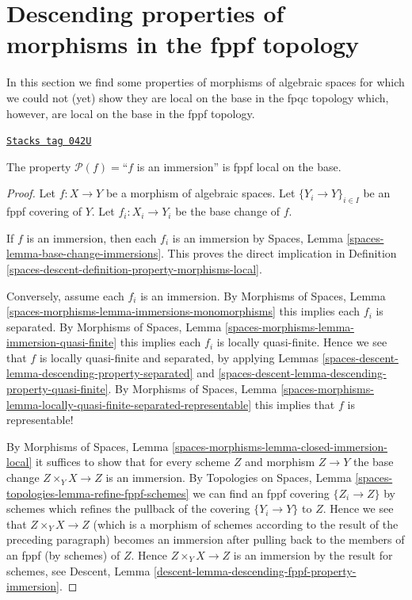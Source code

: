 \section{Descending properties of morphisms in the fppf topology}
\label{spaces-descent-section-descending-properties-morphisms-fppf}
In this section we find some properties of morphisms of algebraic spaces
for which we could not (yet) show they are local on the base in
the fpqc topology which, however, are local on the base
in the fppf topology.

\begin{lemma}
\label{spaces-descent-lemma-descending-fppf-property-immersion}
\href{https://stacks.math.columbia.edu/tag/042U}{\texttt{Stacks tag 042U}}

The property $\mathcal{P}(f) =$``$f$ is an immersion''
is fppf local on the base.
\end{lemma}

\begin{proof}
Let $f : X \to Y$ be a morphism of algebraic spaces.
Let $\{Y_i \to Y\}_{i \in I}$ be an fppf covering of $Y$.
Let $f_i : X_i \to Y_i$ be the base change of $f$.

\medskip\noindent
If $f$ is an immersion, then each $f_i$ is an immersion by
Spaces, Lemma \ref{spaces-lemma-base-change-immersions}.
This proves the direct implication in
Definition \ref{spaces-descent-definition-property-morphisms-local}.

\medskip\noindent
Conversely, assume each $f_i$ is an immersion. By
Morphisms of Spaces,
Lemma \ref{spaces-morphisms-lemma-immersions-monomorphisms}
this implies each $f_i$ is separated. By
Morphisms of Spaces,
Lemma \ref{spaces-morphisms-lemma-immersion-quasi-finite}
this implies each $f_i$ is locally quasi-finite.
Hence we see that $f$ is locally quasi-finite and separated, by applying
Lemmas \ref{spaces-descent-lemma-descending-property-separated}
and \ref{spaces-descent-lemma-descending-property-quasi-finite}.
By
Morphisms of Spaces, Lemma
\ref{spaces-morphisms-lemma-locally-quasi-finite-separated-representable}
this implies that $f$ is representable!

\medskip\noindent
By
Morphisms of Spaces, Lemma \ref{spaces-morphisms-lemma-closed-immersion-local}
it suffices to show that for every scheme $Z$ and morphism $Z \to Y$
the base change $Z \times_Y X \to Z$ is an immersion. By
Topologies on Spaces, Lemma \ref{spaces-topologies-lemma-refine-fppf-schemes}
we can find an fppf covering $\{Z_i \to Z\}$ by schemes which refines
the pullback of the covering $\{Y_i \to Y\}$ to $Z$.
Hence we see that $Z \times_Y X \to Z$ (which is a morphism of schemes
according to the result of the preceding paragraph) becomes an immersion
after pulling back to the members of an fppf (by schemes) of $Z$.
Hence $Z \times_Y X \to Z$ is an immersion by the result for schemes, see
Descent, Lemma \ref{descent-lemma-descending-fppf-property-immersion}.
\end{proof}

